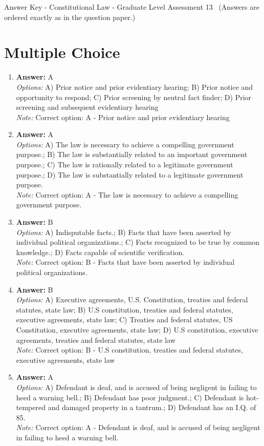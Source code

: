 \documentclass[12pt]{article}
\begin{document}
\begin{center}
Answer Key - Constitutional Law - Graduate Level Assessment 13 \
\small (Answers are ordered exactly as in the question paper.)
\end{center}

\section*{Multiple Choice}
\begin{enumerate}[label=\arabic*.]
\item \textbf{Answer:} A
\\ \textit{Options:} A) Prior notice and prior evidentiary hearing; B) Prior notice and opportunity to respond; C) Prior screening by neutral fact finder; D) Prior screening and subsequent evidentiary hearing
\\ \textit{Note:} Correct option: A - Prior notice and prior evidentiary hearing
\item \textbf{Answer:} A
\\ \textit{Options:} A) The law is necessary to achieve a compelling government purpose.; B) The law is substantially related to an important government purpose.; C) The law is rationally related to a legitimate government purpose.; D) The law is substantially related to a legitimate government purpose.
\\ \textit{Note:} Correct option: A - The law is necessary to achieve a compelling government purpose.
\item \textbf{Answer:} B
\\ \textit{Options:} A) Indisputable facts.; B) Facts that have been asserted by individual political organizations.; C) Facts recognized to be true by common knowledge.; D) Facts capable of scientific verification.
\\ \textit{Note:} Correct option: B - Facts that have been asserted by individual political organizations.
\item \textbf{Answer:} B
\\ \textit{Options:} A) Executive agreements, U.S. Constitution, treaties and federal statutes, state law; B) U.S constitution, treaties and federal statutes, executive agreements, state law; C) Treaties and federal statutes, US Constitution, executive agreements, state law; D) U.S constitution, executive agreements, treaties and federal statutes, state law
\\ \textit{Note:} Correct option: B - U.S constitution, treaties and federal statutes, executive agreements, state law
\item \textbf{Answer:} A
\\ \textit{Options:} A) Defendant is deaf, and is accused of being negligent in failing to heed a warning bell.; B) Defendant has poor judgment.; C) Defendant is hot-tempered and damaged property in a tantrum.; D) Defendant has an I.Q. of 85.
\\ \textit{Note:} Correct option: A - Defendant is deaf, and is accused of being negligent in failing to heed a warning bell.
\end{enumerate}
\end{document}

